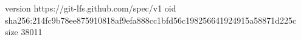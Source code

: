 version https://git-lfs.github.com/spec/v1
oid sha256:214fc9b78ee875910818af9efa888cc1bfd56c198256641924915a58871d225c
size 38011
